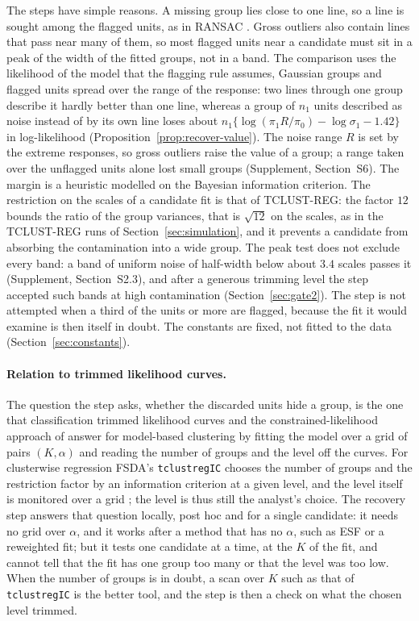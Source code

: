 The steps have simple reasons. A missing group lies close to one line, so a line is sought
among the flagged units, as in RANSAC \citep{fischler1981random}. Gross outliers also contain
lines that pass near many of them, so most flagged units near a candidate must sit in a peak
of the width of the fitted groups, not in a band.
The comparison uses the likelihood of the model that the flagging rule assumes, Gaussian
groups and flagged units spread over the range of the response: two lines through one group
describe it hardly better than one line, whereas a group of $n_1$ units described as noise
instead of by its own line loses about $n_1\{\log(\pi_1R/\pi_0)-\log\sigma_1-1.42\}$ in
log-likelihood (Proposition~\ref{prop:recover-value}). The noise range $R$ is set by the
extreme responses, so gross outliers raise the value of a group; a range taken over the
unflagged units alone lost small groups (Supplement, Section~S6). The margin is a heuristic
modelled on the Bayesian information criterion. The restriction on the scales of a candidate fit is that of
TCLUST-REG: the factor $12$ bounds the ratio of the group variances, that is $\sqrt{12}$ on
the scales, as in the TCLUST-REG runs of Section~\ref{sec:simulation}, and it prevents a
candidate from absorbing the contamination into a wide group. The peak test does not exclude every band: a band of uniform noise of half-width
below about $3.4$ scales passes it (Supplement, Section~S2.3), and after a generous trimming
level the step accepted such bands at high contamination (Section~\ref{sec:gate2}). The step is
not attempted when a third of the units or more are flagged, because the fit it would examine
is then itself in doubt. The constants are fixed, not fitted to the data
(Section~\ref{sec:constants}).

\paragraph{Relation to trimmed likelihood curves.} The question the step asks, whether the
discarded units hide a group, is the one that classification trimmed likelihood curves
\citep{garciaescudero2011exploring} and the constrained-likelihood approach of
\citet{cerioli2018finding} answer for model-based clustering by fitting the model over a grid
of pairs $(K,\alpha)$ and reading the number of groups and the level off the curves. For
clusterwise regression FSDA's \texttt{tclustregIC} \citep{riani2012fsda,torti2021semiautomatic}
chooses the number of groups and the restriction factor by an information criterion at a
given level, and the level itself is monitored over a grid \citep{torti2019assessing}; the
level is thus still the analyst's choice. The recovery step answers that question locally,
post hoc and for a single candidate: it needs no grid over $\alpha$, and it works after a method that has no $\alpha$, such as ESF
or a reweighted fit; but it tests one candidate at a time, at the $K$ of the fit, and cannot
tell that the fit has one group too many or that the level was too low. When the number of
groups is in doubt, a scan over $K$ such as that of \texttt{tclustregIC} is the better tool,
and the step is then a check on what the chosen level trimmed.

